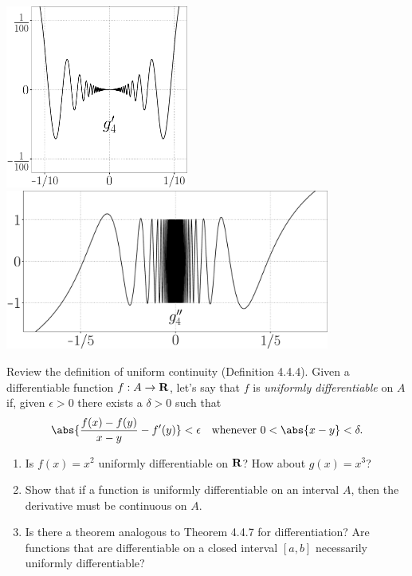 \documentclass{lew98_solutions}
\begin{document}
\begin{solution}
\begin{enumerate}
\begin{center}
            \hspace{4mm}
            \includegraphics[width=0.45\textwidth]{UA_Figures/UA_ex5_2_7_fig_6.pdf} \\[1mm]
            \includegraphics[width=0.8\textwidth]{UA_Figures/UA_ex5_2_7_fig_7.pdf}
        \end{center}
    \end{enumerate}
\end{solution}

\begin{exercise}
\label{ex:5.2.8}
    Review the definition of uniform continuity (Definition 4.4.4). Given a differentiable function \( f : A \to \mathbf{R} \), let's say that \( f \) is \textit{uniformly differentiable} on \( A \) if, given \( \epsilon > 0 \) there exists a \( \delta > 0 \) such that
    \[
        \abs{\frac{f(x) - f(y)}{x - y} - f'(y)} < \epsilon \quad \text{whenever } 0 < \abs{x - y} < \delta. 
    \]
    \begin{enumerate}
        \item Is \( f(x) = x^2 \) uniformly differentiable on \( \mathbf{R} \)? How about \( g(x) = x^3 \)?
        
        \item Show that if a function is uniformly differentiable on an interval \( A \), then the derivative must be continuous on \( A \).

        \item Is there a theorem analogous to Theorem 4.4.7 for differentiation? Are functions that are differentiable on a closed interval \( [a, b] \) necessarily uniformly differentiable?
    \end{enumerate}
\end{exercise}
\end{document}
